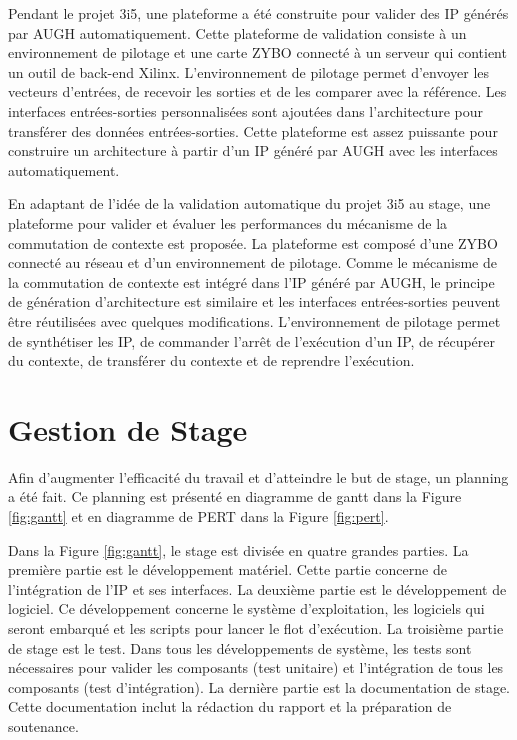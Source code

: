 Pendant le projet 3i5, une plateforme a été construite pour valider des IP générés par AUGH automatiquement\cite{Brisebard2015}.
Cette plateforme de validation consiste à un environnement de pilotage et une carte ZYBO\cite{zyboweb}
connecté à un serveur qui contient un outil de back-end Xilinx. L'environnement de pilotage permet d'envoyer les
vecteurs d'entrées, de recevoir les sorties et de les comparer avec la référence.
Les interfaces entrées-sorties personnalisées sont ajoutées dans l'architecture pour transférer des données entrées-sorties.
Cette plateforme est assez puissante pour construire un architecture à partir d'un IP généré par AUGH
avec les interfaces automatiquement.

En adaptant de l'idée de la validation automatique du projet 3i5 au stage, une plateforme pour valider et évaluer les performances du mécanisme
de la commutation de contexte est proposée. La plateforme est composé d'une ZYBO connecté au réseau et d'un environnement de pilotage.
Comme le mécanisme de la commutation de contexte est intégré dans l'IP généré par AUGH,
le principe de génération d'architecture est similaire et les interfaces entrées-sorties peuvent être réutilisées avec quelques 
modifications. L'environnement de pilotage permet de
synthétiser les IP, de commander l'arrêt de l'exécution d'un IP, de récupérer du contexte, de transférer du contexte et
de reprendre l'exécution.

\section{Gestion de Stage}
\label{sec:gestion}
\justify
Afin d'augmenter l'efficacité du travail et d'atteindre le but de stage, un planning a été fait.
Ce planning est présenté en diagramme de gantt dans la Figure \ref{fig:gantt} et en diagramme de PERT
dans la Figure \ref{fig:pert}.

Dans la Figure \ref{fig:gantt}, le stage est divisée en quatre grandes parties. La première partie est le développement matériel. Cette partie concerne
de l'intégration de l'IP et ses interfaces. La deuxième partie est le développement de logiciel. Ce développement
concerne le système d'exploitation, les logiciels qui seront embarqué et les scripts pour lancer le flot d'exécution.
La troisième partie de stage est le test. Dans tous les développements de système, les tests sont nécessaires
pour valider les composants (test unitaire) et l'intégration de tous les composants (test d'intégration). La dernière partie
est la documentation de stage. Cette documentation inclut la rédaction du rapport et la préparation de soutenance.

